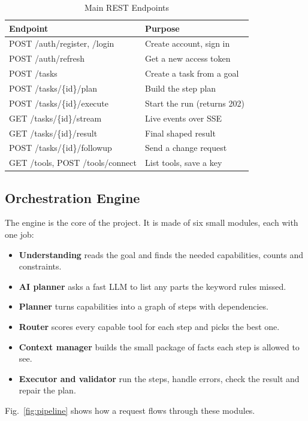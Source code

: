 \documentclass[conference]{IEEEtran}
\begin{document}
\begin{table}[htbp]
\caption{Main REST Endpoints}
\begin{center}
\footnotesize
\begin{tabular}{@{}lp{3.7cm}@{}}
\toprule
\textbf{Endpoint} & \textbf{Purpose} \\
\midrule
POST /auth/register, /login & Create account, sign in \\
POST /auth/refresh & Get a new access token \\
POST /tasks & Create a task from a goal \\
POST /tasks/\{id\}/plan & Build the step plan \\
POST /tasks/\{id\}/execute & Start the run (returns 202) \\
GET /tasks/\{id\}/stream & Live events over SSE \\
GET /tasks/\{id\}/result & Final shaped result \\
POST /tasks/\{id\}/followup & Send a change request \\
GET /tools, POST /tools/connect & List tools, save a key \\
\bottomrule
\end{tabular}
\label{tab:api}
\end{center}
\end{table}

\subsection{Orchestration Engine}
The engine is the core of the project. It is made of six small modules, each with one job:
\begin{itemize}
\item \textbf{Understanding} reads the goal and finds the needed capabilities, counts and constraints.
\item \textbf{AI planner} asks a fast LLM to list any parts the keyword rules missed.
\item \textbf{Planner} turns capabilities into a graph of steps with dependencies.
\item \textbf{Router} scores every capable tool for each step and picks the best one.
\item \textbf{Context manager} builds the small package of facts each step is allowed to see.
\item \textbf{Executor and validator} run the steps, handle errors, check the result and repair the plan.
\end{itemize}
Fig.~\ref{fig:pipeline} shows how a request flows through these modules.
\end{document}
